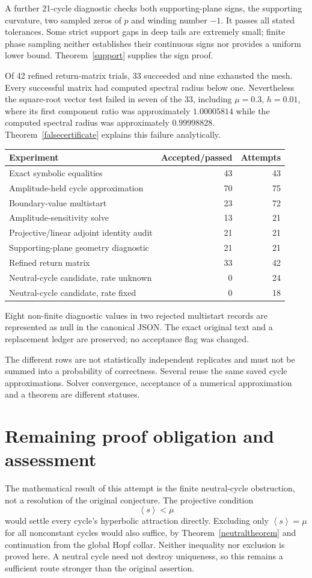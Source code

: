 \documentclass[11pt,a4paper]{article}
\theoremstyle{remark}\newtheorem{remark}[theorem]{Remark}
\newcommand{\av}[1]{\left\langle #1\right\rangle}
\begin{document}
A further 21-cycle diagnostic checks both supporting-plane signs, the supporting curvature, two sampled zeros of $p$ and winding number $-1$. It passes all stated tolerances. Some strict support gaps in deep tails are extremely small; finite phase sampling neither establishes their continuous signs nor provides a uniform lower bound. Theorem~\ref{support} supplies the sign proof.

Of 42 refined return-matrix trials, 33 succeeded and nine exhausted the mesh. Every successful matrix had computed spectral radius below one. Nevertheless the square-root vector test failed in seven of the 33, including $\mu=0.3$, $h=0.01$, where its first component ratio was approximately $1.00005814$ while the computed spectral radius was approximately $0.99998828$. Theorem~\ref{falsecertificate} explains this failure analytically.

\begin{center}\small
\begin{tabular}{p{79mm}rr}
\toprule Experiment & Accepted/passed & Attempts\\\midrule
Exact symbolic equalities &43&43\\
Amplitude-held cycle approximation &70&75\\
Boundary-value multistart &23&72\\
Amplitude-sensitivity solve &13&21\\
Projective/linear adjoint identity audit &21&21\\
Supporting-plane geometry diagnostic &21&21\\
Refined return matrix &33&42\\
Neutral-cycle candidate, rate unknown &0&24\\
Neutral-cycle candidate, rate fixed &0&18\\\bottomrule
\end{tabular}
\end{center}
Eight non-finite diagnostic values in two rejected multistart records are represented as null in the canonical JSON. The exact original text and a replacement ledger are preserved; no acceptance flag was changed.

The different rows are not statistically independent replicates and must not be summed into a probability of correctness. Several reuse the same saved cycle approximations. Solver convergence, acceptance of a numerical approximation and a theorem are different statuses.

\section{Remaining proof obligation and assessment}
The mathematical result of this attempt is the finite neutral-cycle obstruction, not a resolution of the original conjecture. The projective condition
\[
 \av{s}<\mu
\]
would settle every cycle's hyperbolic attraction directly. Excluding only $\av{s}=\mu$ for all nonconstant cycles would also suffice, by Theorem~\ref{neutraltheorem} and continuation from the global Hopf collar. Neither inequality nor exclusion is proved here. A neutral cycle need not destroy uniqueness, so this remains a sufficient route stronger than the original assertion.
\end{document}
